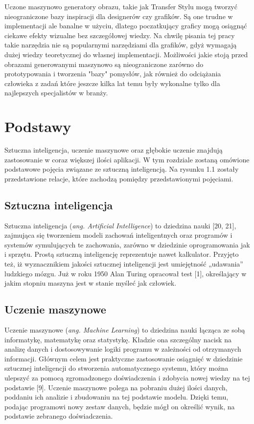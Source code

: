 \documentclass[openright]{xmgr}
\begin{document}
 Uczone maszynowo generatory obrazu, takie jak Transfer Stylu mogą tworzyć nieograniczone bazy inspiracji dla designerów czy grafików. Są one trudne w implementacji ale banalne w użyciu, dlatego poczatkujący graficy mogą osiągnąć ciekawe efekty wizualne bez szczegółowej wiedzy. Na chwilę pisania tej pracy takie narzędzia nie są popularnymi narzędziami dla grafików, gdyż wymagają dużej wiedzy teoretycznej do własnej implementacji. Możliwości jakie stoją przed obrazami generowanymi maszynowo są nieograniczone zarówno do prototypowania i tworzenia "bazy" pomysłów, jak również do odciążania człowieka z zadań które jeszcze kilka lat temu były wykonalne tylko dla najlepszych specjalistów w branży.


\chapter{Podstawy\label{s:dtd}}

\indent \indent Sztuczna inteligencja, uczenie maszynowe oraz głębokie uczenie znajdują zastosowanie w coraz większej ilości aplikacji. W tym rozdziale zostaną omówione podstawowe pojęcia związane ze sztuczną inteligencją. Na rysunku 1.1 zostały przedstawione relacje, które zachodzą pomiędzy przedstawionymi pojęciami.

\section{Sztuczna inteligencja}

\indent \indent Sztuczna inteligencja (\textit{ang. Artificial Intelligence}) to dziedzina nauki [20, 21], zajmująca się tworzeniem modeli zachowań inteligentnych oraz programów i systemów symulujących te zachowania, zarówno w dziedzinie oprogramowania jak i sprzętu. Prostą sztuczną inteligencję reprezentuje nawet kalkulator. Przyjęto też, iż wyznacznikiem jakości sztucznej inteligencji jest umiejętność „udawania” ludzkiego mózgu. Już w roku 1950 Alan Turing opracował test [1], określający w jakim stopniu maszyna jest w stanie myśleć jak człowiek.



\section{Uczenie maszynowe}

\indent \indent Uczenie maszynowe (\textit{ang. Machine Learning}) to dziedzina nauki łącząca ze sobą informatykę, matematykę oraz statystykę. Kładzie ona szczególny nacisk na analizę danych i dostosowywanie logiki programu w zależności od otrzymanych informacji. Głównym celem jest praktyczne zastosowanie osiągnięć w dziedzinie sztucznej inteligencji do stworzenia automatycznego systemu, który można ulepszyć za pomocą zgromadzonego doświadczenia i zdobycia nowej wiedzy na tej podstawie [9]. Uczenie maszynowe polega na pobraniu dużej ilości danych, poddaniu ich analizie i zbudowaniu na tej podstawie modelu. Dzięki temu, podając programowi nowy zestaw danych, będzie mógł on określić wynik, na podstawie zebranego doświadczenia. 
\end{document}
